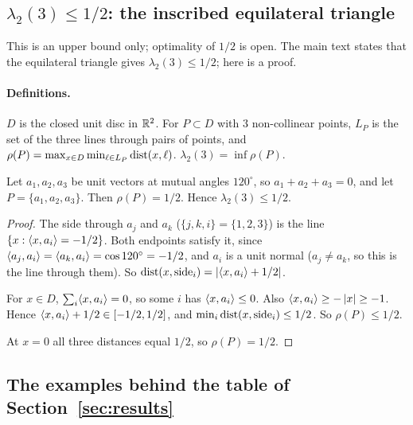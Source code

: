 \subsection{\texorpdfstring{$\lambda_2(3) \le 1/2$: the inscribed equilateral triangle}{lambda\_2(3) <= 1/2: the inscribed equilateral triangle}}\label{sec:B-triangle}

This is an upper bound only; optimality of $1/2$ is open. The main text states that the
equilateral triangle gives $\lambda_2(3) \le 1/2$; here is a proof.

\paragraph{Definitions.}
$D$ is the closed unit disc in $\mathbb{R}^2$. For $P \subset D$ with $3$ non-collinear points, $L_P$ is
the set of the three lines through pairs of points, and
$\rho(P) = \max_{x \in D} \min_{\ell \in L_P} \operatorname{dist}(x, \ell)$. $\lambda_2(3) = \inf \rho(P)$.

\begin{proposition}\label{prop:B-triangle}
Let $a_1, a_2, a_3$ be unit vectors at mutual angles $120^\circ$, so $a_1 + a_2 + a_3 = 0$, and let
$P = \{a_1, a_2, a_3\}$. Then $\rho(P) = 1/2$. Hence $\lambda_2(3) \le 1/2$.
\end{proposition}

\begin{proof}
The side through $a_j$ and $a_k$ ($\{j, k, i\} = \{1, 2, 3\}$) is the line
$\{x : \langle x,a_i\rangle = -1/2\}$. Both endpoints satisfy it, since
$\langle a_j,a_i\rangle = \langle a_k,a_i\rangle = \cos 120^\circ = -1/2$, and $a_i$ is a unit normal ($a_j \ne a_k$,
so this is the line through them). So $\operatorname{dist}(x, \mathrm{side}_i) = \left|\langle x,a_i\rangle + 1/2\right|$.

For $x \in D$, $\sum_i \langle x,a_i\rangle = 0$, so some $i$ has $\langle x,a_i\rangle \le 0$. Also
$\langle x,a_i\rangle \ge -\left|x\right| \ge -1$. Hence $\langle x,a_i\rangle + 1/2 \in [-1/2, 1/2]$, and
$\min_i \operatorname{dist}(x, \mathrm{side}_i) \le 1/2$. So $\rho(P) \le 1/2$.

At $x = 0$ all three distances equal $1/2$, so $\rho(P) = 1/2$.
\end{proof}

\subsection{The examples behind the table of Section~\ref{sec:results}}\label{sec:B-examples}

